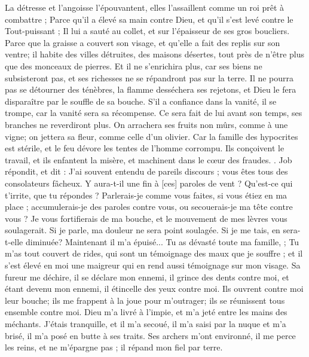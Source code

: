 \begin{multicols}{2}
La détresse et l'angoisse l'épouvantent, elles l'assaillent comme un roi prêt à combattre ;
Parce qu'il a élevé sa main contre Dieu, et qu'il s'est levé contre le Tout-puissant ;
Il lui a sauté au collet, et sur l'épaisseur de ses gros boucliers. 
Parce que la graisse a couvert son visage, et qu'elle a fait des replis sur son ventre;
 il habite des villes détruites, des maisons désertes, tout près de n'être plus que des monceaux de pierres. 
Et il ne s'enrichira plus, car ses biens ne subsisteront pas, et ses richesses ne se répandront pas sur la terre. 
Il ne pourra pas se détourner des ténèbres, la flamme desséchera ses rejetons, et Dieu le fera disparaître par le souffle de sa bouche.
S'il a confiance dans la vanité, il se trompe, car la vanité sera sa récompense.
Ce sera fait de lui avant son temps, ses branches ne reverdiront plus. 
On arrachera ses fruits non mûrs, comme à une vigne; on jettera sa fleur, comme celle d'un olivier. 
Car la famille des hypocrites est stérile, et le feu dévore les tentes de l'homme corrompu.
Ils conçoivent le travail, et ils enfantent la misère, et machinent dans le cœur des fraudes. .
\VerseOne{}Job répondit, et dit :
J'ai souvent entendu de pareils discours ; vous êtes tous des consolateurs fâcheux.
Y aura-t-il une fin à [ces] paroles de vent ? Qu'est-ce qui t'irrite, que tu répondes ?
Parlerais-je comme vous faites, si vous étiez en ma place ; accumulerais-je des paroles contre vous, ou secouerais-je ma tête contre vous ? 
Je vous fortifierais de ma bouche, et le mouvement de mes lèvres vous soulagerait.
Si je parle, ma douleur ne sera point soulagée. Si je me tais, en sera-t-elle diminuée?
Maintenant il m'a épuisé... Tu as dévasté toute ma famille, ;
Tu m'as tout couvert de rides, qui sont un témoignage des maux que je souffre ; et il s'est élevé en moi une maigreur qui en rend aussi témoignage sur mon visage. 
Sa fureur me déchire, il se déclare mon ennemi, il grince des dents contre moi, et étant devenu mon ennemi, il étincelle des yeux contre moi.
Ils ouvrent contre moi leur bouche; ils me frappent à la joue pour m'outrager; ils se réunissent tous ensemble contre moi. 
Dieu m'a livré à l'impie, et m'a jeté entre les mains des méchants. 
J'étais tranquille, et il m'a secoué, il m'a saisi par la nuque et m'a brisé, il m'a posé en butte à ses traits.
Ses archers m'ont environné, il me perce les reins, et ne m'épargne pas ; il répand mon fiel par terre. 

\end{multicols}
